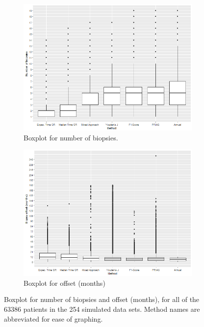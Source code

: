 \begin{figure}[!htb]
    \centering
    \captionsetup{justification=centering}
     \begin{subfigure}[b]{0.45\textwidth}
        \includegraphics[width=\textwidth]{images/sim_study/nbBoxPlot_all.png}
        \caption{Boxplot for number of biopsies.}
        \label{fig : nbBoxPlot}
    \end{subfigure}
    \begin{subfigure}[b]{0.45\textwidth}
        \includegraphics[width=\textwidth]{images/sim_study/offsetBoxPlot_all.png}
        \caption{Boxplot for offset (months)}
        \label{fig : offsetBoxPlot}
    \end{subfigure}      
    \caption{Boxplot for number of biopsies and offset (months), for all of the 63386 patients in the 254 simulated data sets. Method names are abbreviated for ease of graphing.}
\end{figure}
